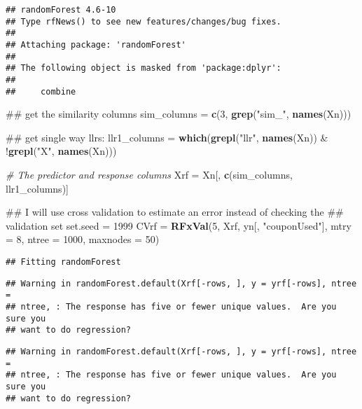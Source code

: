 \documentclass[10pt]{report}
\newenvironment{Shaded}{}{}
\newcommand{\KeywordTok}[1]{\textcolor[rgb]{0.00,0.44,0.13}{\textbf{{#1}}}}
\newcommand{\DataTypeTok}[1]{\textcolor[rgb]{0.56,0.13,0.00}{{#1}}}
\newcommand{\DecValTok}[1]{\textcolor[rgb]{0.25,0.63,0.44}{{#1}}}
\newcommand{\StringTok}[1]{\textcolor[rgb]{0.25,0.44,0.63}{{#1}}}
\newcommand{\CommentTok}[1]{\textcolor[rgb]{0.38,0.63,0.69}{\textit{{#1}}}}
\newcommand{\NormalTok}[1]{{#1}}
\begin{document}
\begin{verbatim}
## randomForest 4.6-10
## Type rfNews() to see new features/changes/bug fixes.
## 
## Attaching package: 'randomForest'
## 
## The following object is masked from 'package:dplyr':
## 
##     combine
\end{verbatim}

\begin{Shaded}
\begin{Highlighting}[]
\NormalTok{## get the similarity columns}
\NormalTok{sim_columns =}\StringTok{ }\KeywordTok{c}\NormalTok{(}\DecValTok{3}\NormalTok{, }\KeywordTok{grep}\NormalTok{(}\StringTok{"sim_"}\NormalTok{, }\KeywordTok{names}\NormalTok{(Xn)))}

\NormalTok{## get single way llrs:}
\NormalTok{llr1_columns =}\StringTok{ }\KeywordTok{which}\NormalTok{(}\KeywordTok{grepl}\NormalTok{(}\StringTok{"llr"}\NormalTok{, }\KeywordTok{names}\NormalTok{(Xn)) &}\StringTok{ }\NormalTok{!}\KeywordTok{grepl}\NormalTok{(}\StringTok{"X"}\NormalTok{, }\KeywordTok{names}\NormalTok{(Xn)))}

\CommentTok{# The predictor and response columns}
\NormalTok{Xrf =}\StringTok{ }\NormalTok{Xn[, }\KeywordTok{c}\NormalTok{(sim_columns, llr1_columns)]}

\NormalTok{## I will use cross validation to estimate an error instead of checking the}
\NormalTok{## validation set}
\NormalTok{set.seed =}\StringTok{ }\DecValTok{1999}
\NormalTok{CVrf =}\StringTok{ }\KeywordTok{RFxVal}\NormalTok{(}\DecValTok{5}\NormalTok{, Xrf, yn[, }\StringTok{"couponUsed"}\NormalTok{], }\DataTypeTok{mtry =} \DecValTok{8}\NormalTok{, }\DataTypeTok{ntree =} \DecValTok{1000}\NormalTok{, }\DataTypeTok{maxnodes =} \DecValTok{50}\NormalTok{)}
\end{Highlighting}
\end{Shaded}

\begin{verbatim}
## Fitting randomForest
\end{verbatim}

\begin{verbatim}
## Warning in randomForest.default(Xrf[-rows, ], y = yrf[-rows], ntree =
## ntree, : The response has five or fewer unique values.  Are you sure you
## want to do regression?
\end{verbatim}

\begin{verbatim}
## Warning in randomForest.default(Xrf[-rows, ], y = yrf[-rows], ntree =
## ntree, : The response has five or fewer unique values.  Are you sure you
## want to do regression?
\end{verbatim}
\end{document}
